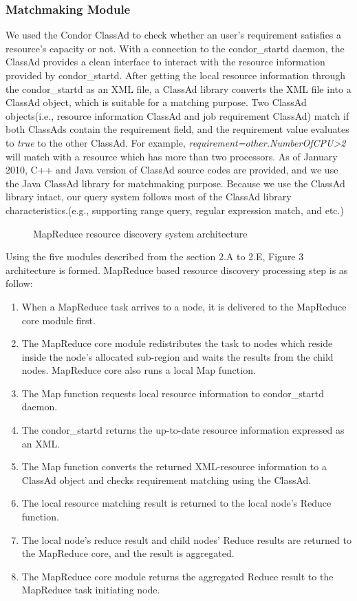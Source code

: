 \documentclass{acm_proc_article-sp}
\begin{document}
\subsubsection{Matchmaking Module}
We used the Condor ClassAd\cite{classad} to check whether an user's requirement satisfies a resource's capacity or not. 
With a connection to the condor\_startd daemon, the ClassAd provides a clean interface to interact with the resource information provided by condor\_startd. 
After getting the local resource information through the condor\_startd as an XML file, a ClassAd library converts the XML file into a ClassAd object, which is suitable for a matching purpose.
Two ClassAd objects(i.e., resource information ClassAd and job requirement ClassAd) match if both ClassAds contain the requirement field, and the requirement value evaluates to \textit{true} to the other ClassAd. 
For example, \textit{requirement=other.NumberOfCPU>2} will match with a resource which has more than two processors.
As of January 2010, C++ and Java version of ClassAd source codes are provided, and we use the Java ClassAd library for matchmaking purpose. 
Because we use the ClassAd library intact, our query system follows most of the ClassAd library characteristics.(e.g., supporting range query, regular expression match, and etc.)
\begin{figure}
\centering
{}
\caption{MapReduce resource discovery system architecture}
\end{figure}

Using the five modules described from the section 2.A to 2.E, Figure 3 architecture is formed. MapReduce based resource discovery processing step is as follow:
\begin{enumerate}
\setlength{\itemsep}{0pt}
\setlength{\parskip}{0pt}
\item When a MapReduce task arrives to a node, it is delivered to the MapReduce core module first.
\item The MapReduce core module redistributes the task to nodes which reside inside the node's allocated sub-region and waits the results from the child nodes. MapReduce core also runs a local Map function.
\item The Map function requests local resource information to condor\_startd daemon.
\item The condor\_startd returns the up-to-date resource information expressed as an XML.
\item The Map function converts the returned XML-resource information to a ClassAd object and checks requirement matching using the ClassAd.
\item The local resource matching result is returned to the local node's Reduce function.
\item The local node's reduce result and child nodes' Reduce results are returned to the MapReduce core, and the result is aggregated.
\item The MapReduce core module returns the aggregated Reduce result to the MapReduce task initiating node.
\end{enumerate}
\end{document}
